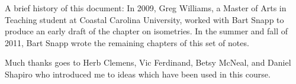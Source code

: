A brief history of this document: In 2009, Greg Williams, a Master of
Arts in Teaching student at Coastal Carolina University, worked with
Bart Snapp to produce an early draft of the chapter on isometries. In
the summer and fall of 2011, Bart Snapp wrote the remaining chapters of this
set of notes. 

Much thanks goes to Herb Clemens, Vic Ferdinand, Betsy McNeal, and
Daniel Shapiro who introduced me to ideas which have been used in this
course.



\tableofcontents













